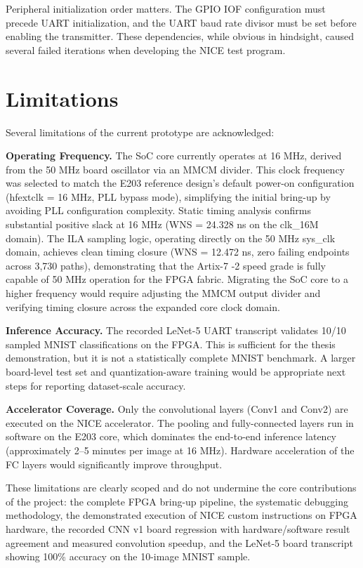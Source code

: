 Peripheral initialization order matters. The GPIO IOF configuration must precede UART initialization, and the UART baud rate divisor must be set before enabling the transmitter. These dependencies, while obvious in hindsight, caused several failed iterations when developing the NICE test program.


\section{Limitations}\label{sec:5_5}

Several limitations of the current prototype are acknowledged:

\textbf{Operating Frequency.} The SoC core currently operates at 16 MHz, derived from the 50 MHz board oscillator via an MMCM divider. This clock frequency was selected to match the E203 reference design's default power-on configuration (hfextclk = 16 MHz, PLL bypass mode), simplifying the initial bring-up by avoiding PLL configuration complexity. Static timing analysis confirms substantial positive slack at 16 MHz (WNS = 24.328 ns on the clk\_16M domain). The ILA sampling logic, operating directly on the 50 MHz sys\_clk domain, achieves clean timing closure (WNS = 12.472 ns, zero failing endpoints across 3,730 paths), demonstrating that the Artix-7 -2 speed grade is fully capable of 50 MHz operation for the FPGA fabric. Migrating the SoC core to a higher frequency would require adjusting the MMCM output divider and verifying timing closure across the expanded core clock domain.

\textbf{Inference Accuracy.} The recorded LeNet-5 UART transcript validates 10/10 sampled MNIST classifications on the FPGA. This is sufficient for the thesis demonstration, but it is not a statistically complete MNIST benchmark. A larger board-level test set and quantization-aware training would be appropriate next steps for reporting dataset-scale accuracy.

\textbf{Accelerator Coverage.} Only the convolutional layers (Conv1 and Conv2) are executed on the NICE accelerator. The pooling and fully-connected layers run in software on the E203 core, which dominates the end-to-end inference latency (approximately 2--5 minutes per image at 16 MHz). Hardware acceleration of the FC layers would significantly improve throughput.


These limitations are clearly scoped and do not undermine the core contributions of the project: the complete FPGA bring-up pipeline, the systematic debugging methodology, the demonstrated execution of NICE custom instructions on FPGA hardware, the recorded CNN v1 board regression with hardware/software result agreement and measured convolution speedup, and the LeNet-5 board transcript showing 100\% accuracy on the 10-image MNIST sample.

